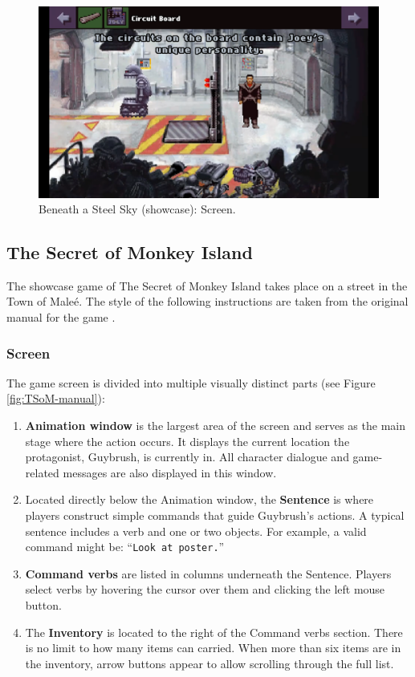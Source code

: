 \begin{figure}[H]
\centering
\includegraphics[width=.8\linewidth]{img/manual.png}
\caption{Beneath a Steel Sky (showcase): Screen.}
\label{fig:BaSS-manual}
\end{figure}

\subsection{The Secret of Monkey Island}
The showcase game of The Secret of Monkey Island takes place on a street in the Town of Maleé. The style of the following instructions are taken from the original manual for the game \cite{TSoMI-Manual}.

\subsubsection{Screen}
The game screen is divided into multiple visually distinct parts (see Figure \ref{fig:TSoM-manual}):
\begin{enumerate}
    \item \textbf{Animation window} is the largest area of the screen and serves as the main stage where the action occurs. It displays the current location the protagonist, Guybrush, is currently in. All character dialogue and game-related messages are also displayed in this window. 
    \item Located directly below the Animation window, the \textbf{Sentence} is where players construct simple commands that guide Guybrush's actions. A typical sentence includes a verb and one or two objects. For example, a valid command might be: “\verb|Look at poster.|”
    \item \textbf{Command verbs} are listed in columns underneath the Sentence. Players select verbs by hovering the cursor over them and clicking the left mouse button.
    \item The \textbf{Inventory} is located to the right of the Command verbs section. There is no limit to how many items can carried. When more than six items are in the inventory, arrow buttons appear to allow scrolling through the full list. 
\end{enumerate}


